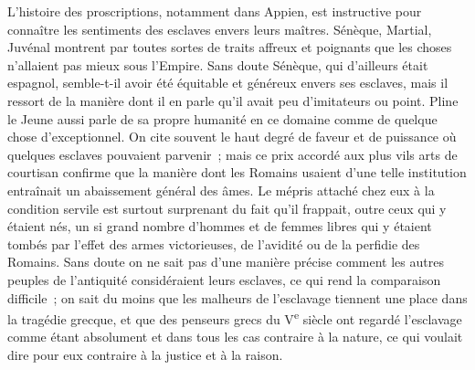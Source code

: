 \documentclass[french,twoside]{book} %
\begin{document}
L'histoire des proscriptions, notamment dans Appien, est instructive pour connaître les sentiments des esclaves envers leurs maîtres. Sénèque, Martial, Juvénal montrent par toutes sortes de traits affreux et poignants que les choses n'allaient pas mieux sous l'Empire. Sans doute Sénèque, qui d'ailleurs était espagnol, semble-t-il avoir été équitable et généreux envers ses esclaves, mais il ressort de la manière dont il en parle qu'il avait peu d'imitateurs ou point. Pline le Jeune aussi parle de sa propre humanité en ce domaine comme de quelque chose d'exceptionnel. On cite souvent le haut degré de faveur et de puissance où quelques esclaves pouvaient parvenir ; mais ce prix accordé aux plus vils arts de courtisan confirme que la manière dont les Romains usaient d'une telle institution entraînait un abaissement général des âmes. Le mépris attaché chez eux à la condition servile est surtout surprenant du fait qu'il frappait, outre ceux qui y étaient nés, un si grand nombre d'hommes et de femmes libres qui y étaient tombés par l'effet des armes victorieuses, de l'avidité ou de la perfidie des Romains. Sans doute on ne sait pas d'une manière précise comment les autres peuples de l'antiquité considéraient leurs esclaves, ce qui rend la comparaison difficile ; on sait du moins que les malheurs de l'esclavage tiennent une place dans la tragédie grecque, et que des penseurs grecs du V\textsuperscript{e} siècle ont regardé l'esclavage comme étant absolument et dans tous les cas contraire à la nature, ce qui voulait dire pour eux contraire à la justice et à la raison.\par
\end{document}
